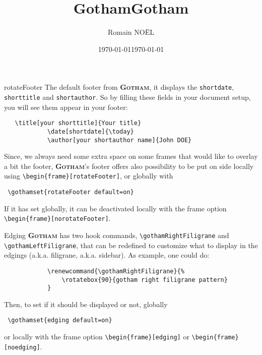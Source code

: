 \documentclass[aspectratio=169]{beamer}
\newcommand{\themename}{\textbf{\textsc{Gotham}}}
\begin{document}
	\title[your shorttitle]{Gotham}
	\date[shortdate]{\today}
	\author[your shortauthor name]{Romain NOËL}
	\begin{frame}{rotateFooter}
		The default footer from \themename{}, it displays the \verb|shortdate|, \verb|shorttitle| and \verb|shortauthor|.
		So by filling these fields in your document setup, you will see them appear in your footer:
		\begin{verbatim}   \title[your shorttitle]{Your title}
			\date[shortdate]{\today}
			\author[your shortauthor name]{John DOE} \end{verbatim}

		Since, we always need some extra space on some frames that would like to overlay a bit the footer, \themename{}'s footer offers also possibility to be put on side locally using \verb|\begin{frame}[rotateFooter]|, or globally with 
		\begin{verbatim} \gothamset{rotateFooter default=on} \end{verbatim}
		If it has set globally, it can be deactivated locally with the frame option \verb|\begin{frame}[norotateFooter]|.
	\end{frame}

	\title[]{Gotham}
	\date[]{\today}
	\renewcommand{\gothamRightFiligrane}{%
		\rotatebox{90}{gotham right filigrane pattern}
	}
	\begin{frame}{Edging}
		\themename{} has two hook commands, \verb|\gothamRightFiligrane| and \verb|\gothamLeftFiligrane|, that can be redefined to customize what to display in the edgings (a.k.a. filigrane, a.k.a. sidebar).
		As example, one could do:
		\begin{verbatim}
			\renewcommand{\gothamRightFiligrane}{%
				\rotatebox{90}{gotham right filigrane pattern}
			}\end{verbatim}

		Then, to set if it should be displayed or not, globally \begin{verbatim} \gothamset{edging default=on} \end{verbatim}
		or locally with the frame option \verb|\begin{frame}[edging]| or \verb|\begin{frame}[noedging]|.
	\end{frame}
\end{document}

